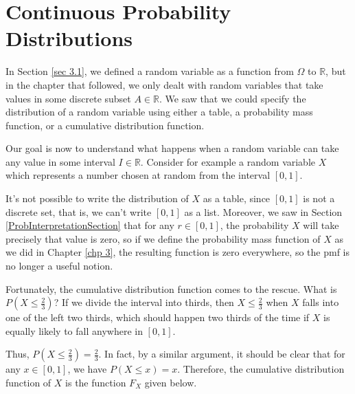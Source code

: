 \section{Continuous Probability Distributions} \label{sec 4.1}

In Section \ref{sec 3.1}, we defined a random variable as a function from $\Omega$ to $\mathbb{R}$, but in the chapter that followed, we only dealt with random variables that take values in some discrete subset $A \in \mathbb{R}$. We saw that we could specify the distribution of a random variable using either a table, a probability mass function, or a cumulative distribution function.
\par
Our goal is now to understand what happens when a random variable can take any value in some interval $I \in \mathbb{R}$. Consider for example a random variable $X$ which represents a number chosen at random from the interval $[0,1]$.
\par
It's not possible to write the distribution of $X$ as a table, since $[0,1]$ is not a discrete set, that is, we can't write $[0,1]$ as a list. Moreover, we saw in Section \ref{ProbInterpretationSection} that for any $r \in [0,1]$, the probability $X$ will take precisely that value is zero, so if we define the probability mass function of $X$ as we did in Chapter \ref{chp 3}, the resulting function is zero everywhere, so the pmf is no longer a useful notion.
\par
Fortunately, the cumulative distribution function comes to the rescue. What is $P(X \leq \frac{2}{3})$? If we divide the interval into thirds, then $X \leq \frac{2}{3}$ when $X$ falls into one of the left two thirds, which should happen two thirds of the time if $X$ is equally likely to fall anywhere in $[0,1]$.
\vspace{0.5em}
\begin{center}
\end{center}
\par
Thus, $P(X \leq \frac{2}{3}) = \frac{2}{3}$. In fact, by a similar argument, it should be clear that for any $x \in [0,1]$, we have $P(X \leq x) = x$. Therefore, the cumulative distribution function of $X$ is the function $F_X$ given below.

